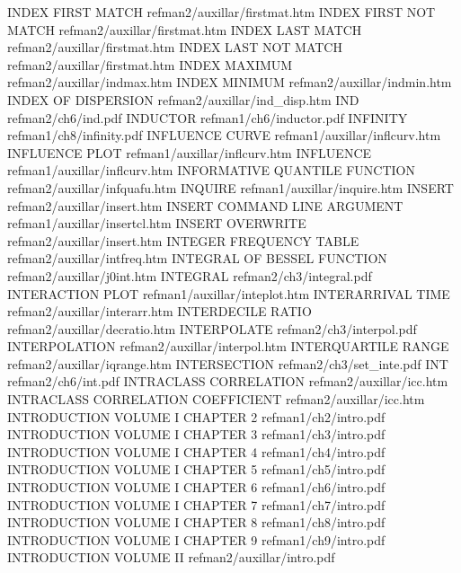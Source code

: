 INDEX FIRST MATCH                       refman2/auxillar/firstmat.htm
INDEX FIRST NOT MATCH                   refman2/auxillar/firstmat.htm
INDEX LAST MATCH                        refman2/auxillar/firstmat.htm
INDEX LAST NOT MATCH                    refman2/auxillar/firstmat.htm
INDEX MAXIMUM                           refman2/auxillar/indmax.htm
INDEX MINIMUM                           refman2/auxillar/indmin.htm
INDEX OF DISPERSION                     refman2/auxillar/ind_disp.htm
IND                                     refman2/ch6/ind.pdf
INDUCTOR                                refman1/ch6/inductor.pdf
INFINITY                                refman1/ch8/infinity.pdf
INFLUENCE CURVE                         refman1/auxillar/inflcurv.htm
INFLUENCE PLOT                          refman1/auxillar/inflcurv.htm
INFLUENCE                               refman1/auxillar/inflcurv.htm
INFORMATIVE QUANTILE FUNCTION           refman2/auxillar/infquafu.htm
INQUIRE                                 refman1/auxillar/inquire.htm
INSERT                                  refman2/auxillar/insert.htm
INSERT COMMAND LINE ARGUMENT            refman1/auxillar/insertcl.htm
INSERT OVERWRITE                        refman2/auxillar/insert.htm
INTEGER FREQUENCY TABLE                 refman2/auxillar/intfreq.htm
INTEGRAL OF BESSEL FUNCTION             refman2/auxillar/j0int.htm
INTEGRAL                                refman2/ch3/integral.pdf
INTERACTION PLOT                        refman1/auxillar/inteplot.htm
INTERARRIVAL TIME                       refman2/auxillar/interarr.htm
INTERDECILE RATIO                       refman2/auxillar/decratio.htm
INTERPOLATE                             refman2/ch3/interpol.pdf
INTERPOLATION                           refman2/auxillar/interpol.htm
INTERQUARTILE RANGE                     refman2/auxillar/iqrange.htm
INTERSECTION                            refman2/ch3/set_inte.pdf
INT                                     refman2/ch6/int.pdf
INTRACLASS CORRELATION                  refman2/auxillar/icc.htm
INTRACLASS CORRELATION COEFFICIENT      refman2/auxillar/icc.htm
INTRODUCTION VOLUME I CHAPTER 2         refman1/ch2/intro.pdf
INTRODUCTION VOLUME I CHAPTER 3         refman1/ch3/intro.pdf
INTRODUCTION VOLUME I CHAPTER 4         refman1/ch4/intro.pdf
INTRODUCTION VOLUME I CHAPTER 5         refman1/ch5/intro.pdf
INTRODUCTION VOLUME I CHAPTER 6         refman1/ch6/intro.pdf
INTRODUCTION VOLUME I CHAPTER 7         refman1/ch7/intro.pdf
INTRODUCTION VOLUME I CHAPTER 8         refman1/ch8/intro.pdf
INTRODUCTION VOLUME I CHAPTER 9         refman1/ch9/intro.pdf
INTRODUCTION VOLUME II                  refman2/auxillar/intro.pdf
